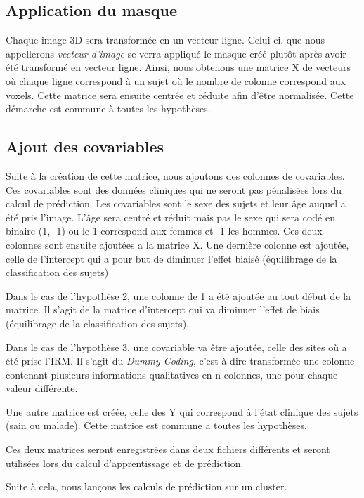\subsection{Application du masque}

Chaque image 3D sera transformée en un vecteur ligne. Celui-ci, que nous appellerons \textit{vecteur d'image} se verra appliqué le masque créé plutôt après avoir été transformé en vecteur ligne. Ainsi, nous obtenons une matrice X de vecteurs où chaque ligne correspond à un sujet où le nombre de colonne correspond aux voxels.
Cette matrice sera ensuite centrée et réduite afin d'être normalisée. 
Cette démarche est commune à toutes les hypothèses. 

\subsection{Ajout des covariables}

Suite à la création de cette matrice, nous ajoutons des colonnes de covariables. Ces covariables sont des données cliniques qui ne seront pas pénalisées lors du calcul de prédiction. Les covariables sont le sexe des sujets et leur âge auquel a été pris l'image. 
L'âge sera centré et réduit mais pas le sexe qui sera codé en binaire (1, -1) ou le 1 correspond aux femmes et -1 les hommes. 
Ces deux colonnes sont ensuite ajoutées a la matrice X. 
Une dernière colonne est ajoutée, celle de l'intercept qui a pour but de diminuer l'effet biaisé (équilibrage de la classification des sujets)

Dans le cas de l'hypothèse 2, une colonne de 1 a été ajoutée au tout début de la matrice.
Il s'agit de la matrice d'intercept qui va diminuer l'effet de biais (équilibrage de la classification des sujets).

Dans le cas de l'hypothèse 3, une covariable va être ajoutée, celle des sites où a été prise l'IRM. Il s'agit du \textit{Dummy Coding}, c'est à dire transformée une colonne contenant plusieurs informations qualitatives en n colonnes, une pour chaque valeur différente. 

Une autre matrice est créée, celle des Y qui correspond à l'état clinique des sujets (sain ou malade). Cette matrice est commune a toutes les hypothèses. 

Ces deux matrices seront enregistrées dans deux fichiers différents et seront utilisées lors du calcul d'apprentissage et de prédiction.


Suite à cela, nous lançons les calculs de prédiction sur un cluster. 


